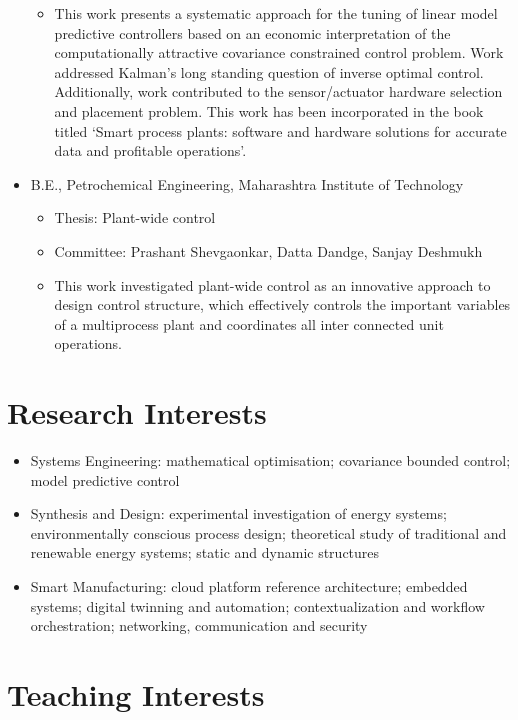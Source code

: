 \documentclass[10pt]{article}
\begin{document}
\begin{itemize}
\begin{itemize}[nosep]
  \item This work presents a systematic approach for the tuning of linear model predictive controllers based on an economic interpretation of the computationally attractive covariance constrained control problem. Work addressed Kalman's long standing question of inverse optimal control. Additionally, work contributed to the sensor/actuator hardware selection and placement problem. This work has been incorporated in the book titled `Smart process plants: software and hardware solutions for accurate data and profitable operations'.
\end{itemize}
\item  B.E., Petrochemical Engineering, Maharashtra Institute of Technology
\begin{itemize}[nosep]
\item Thesis: Plant-wide control
  \item Committee: Prashant Shevgaonkar, Datta Dandge, Sanjay Deshmukh %
  \item This work investigated plant-wide control as an innovative approach to design control structure, which effectively controls the important variables of a multiprocess plant and coordinates all inter connected unit operations.
\end{itemize}
\end{itemize}



\section{Research Interests}
\begin{itemize}[nosep]
\item Systems Engineering: mathematical optimisation; covariance bounded control; model predictive control

\item Synthesis and Design: experimental investigation of energy systems; environmentally conscious process design; theoretical study of traditional and renewable energy systems; static and dynamic structures

\item Smart Manufacturing: cloud platform reference architecture; embedded systems; digital twinning and automation; contextualization and workflow orchestration; networking, communication and security
\end{itemize}


\section{Teaching Interests}
\end{document}
